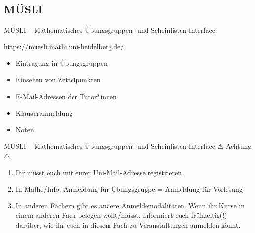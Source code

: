 
\subsection{MÜSLI}
\begin{frame}{MÜSLI -- \normalsize Mathematisches Übungsgruppen- und Scheinlisten-Interface}

    \large \url{https://muesli.mathi.uni-heidelberg.de/}

    \begin{minipage}[t]{0.7\textwidth}

    \begin{itemize}
        \item Eintragung in Übungsgruppen
        \item Einsehen von Zettelpunkten
        \item E-Mail-Adressen der Tutor*innen
        \item Klausuranmeldung
        \item Noten
    \end{itemize}
    \end{minipage}
    \begin{minipage}[t]{0.28\textwidth}
        \vspace*{0em}
        \begin{center}
        \end{center}
    \end{minipage}
\end{frame}

\begin{frame}{MÜSLI -- \normalsize Mathematisches Übungsgruppen- und Scheinlisten-Interface}
    \Large {\LARGE \DejaSans{} ⚠} Achtung {\LARGE \DejaSans{}⚠} \\
    \normalsize
    \begin{enumerate}
        \item{Ihr müsst euch mit eurer Uni-Mail-Adresse registrieren.}
        \item{In Mathe/Info: Anmeldung für Übungsgruppe = Anmeldung für Vorlesung}
        \item{In anderen Fächern gibt es andere Anmeldemodalitäten. Wenn ihr Kurse in einem anderen Fach belegen wollt/müsst, informiert euch frühzeitig(!) darüber, wie ihr euch in diesem Fach zu Veranstaltungen anmelden könnt.}
    \end{enumerate}
\end{frame}

